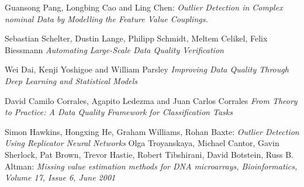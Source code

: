 \documentclass{article}
\begin{document}
\begin{thebibliography}{999}

    Guansong Pang, Longbing Cao and Ling Chen:
    \emph{Outlier Detection in Complex nominal Data
        by Modelling the Feature Value Couplings.}

    Sebastian Schelter, Dustin Lange, Philipp Schmidt, Meltem Celikel, Felix Biessmann
    \emph{Automating Large-Scale Data Quality Verification}

    Wei Dai, Kenji Yoshigoe and William Parsley
    \emph{Improving Data Quality Through Deep Learning and Statistical Models}

    David Camilo Corrales, Agapito Ledezma and Juan Carlos Corrales
    \emph{From Theory to Practice: A Data Quality Framework
        for Classification Tasks}

    Simon Hawkins, Hongxing He, Graham Williams, Rohan Baxte:
    \emph{Outlier Detection Using Replicator Neural Networks}
    Olga Troyanskaya, Michael Cantor, Gavin Sherlock, Pat Brown, Trevor Hastie, Robert Tibshirani, David Botstein, Russ B. Altman:
    \emph{Missing value estimation methods for DNA microarrays, Bioinformatics, Volume 17, Issue 6, June 2001}

\end{thebibliography}
\end{document}
